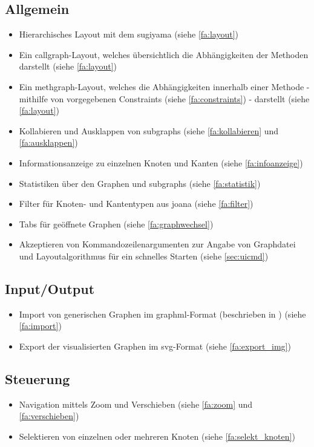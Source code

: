 \subsection{Allgemein}
  \begin{itemize}
    \item Hierarchisches Layout mit dem \gls{sugiyama} (siehe \ref{fa:layout})
    \item Ein \gls{callgraph}-Layout, welches übersichtlich die Abhängigkeiten der Methoden darstellt (siehe \ref{fa:layout})
    \item Ein \gls{methgraph}-Layout, welches die Abhängigkeiten innerhalb einer Methode - mithilfe von vorgegebenen Constraints (siehe \ref{fa:constraints}) - darstellt (siehe \ref{fa:layout})
    \item Kollabieren und Ausklappen von \glspl{subgraph} (siehe \ref{fa:kollabieren} und \ref{fa:ausklappen})
    \item Informationsanzeige zu einzelnen Knoten und Kanten (siehe \ref{fa:infoanzeige})
    \item Statistiken über den Graphen und \glspl{subgraph} (siehe \ref{fa:statistik})
    \item Filter für Knoten- und Kantentypen aus \gls{joana} (siehe \ref{fa:filter})
    \item Tabs für geöffnete Graphen (siehe \ref{fa:graphwechsel})
    \item Akzeptieren von Kommandozeilenargumenten zur Angabe von Graphdatei und Layoutalgorithmus für ein schnelles Starten (siehe \ref{sec:uicmd})
  \end{itemize}

\subsection{Input/Output}
  \begin{itemize}
    \item Import von generischen Graphen im \gls{graphml}-Format (beschrieben in ) (siehe \ref{fa:import})
    \item Export der visualisierten Graphen im \gls{svg}-Format (siehe \ref{fa:export_img})
  \end{itemize}

\subsection{Steuerung}
  \begin{itemize}
    \item Navigation mittels Zoom und Verschieben (siehe \ref{fa:zoom} und \ref{fa:verschieben})
    \item Selektieren von einzelnen oder mehreren Knoten (siehe \ref{fa:selekt_knoten})
  \end{itemize}

